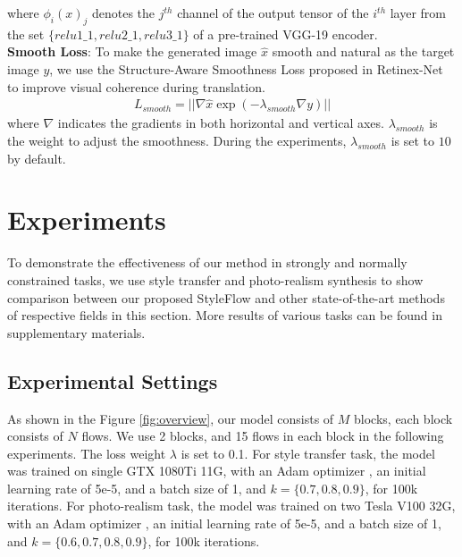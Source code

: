 \documentclass[runningheads]{llncs}
\begin{document}
where $\phi_i(x)_j$ denotes the $j^{th}$ channel of the output tensor of the $i^{th}$ layer from the set  $\{relu1\_1,relu2\_1,relu3\_1\}$ of a pre-trained VGG-19 encoder.\\[1ex]
\noindent\textbf{Smooth Loss}:
To make the generated image $\hat{x}$ smooth and natural as the target image $y$, we use the Structure-Aware Smoothness Loss proposed in Retinex-Net\cite{wei2018deep} to improve visual coherence during translation.
\begin{align}
      L_{smooth} = ||\nabla\hat{x} \exp(-\lambda_{smooth}\nabla y)||
\end{align}
where $\nabla$ indicates the gradients in both horizontal and vertical axes. $\lambda_{smooth}$ is the weight to adjust the smoothness. During the experiments, $\lambda_{smooth}$ is set to $10$ by default.


\section{Experiments}
To demonstrate the effectiveness of our method in strongly and normally constrained tasks, we use style transfer and photo-realism synthesis to show comparison between our proposed StyleFlow and other state-of-the-art methods of respective fields in this section. More results of various tasks can be found in supplementary materials.
\subsection{Experimental Settings}
As shown in the Figure \ref{fig:overview}, our model consists of $M$ blocks, each block consists of $N$ flows. We use 2 blocks, and 15 flows in each block in the following experiments. The loss weight $\lambda$ is set to 0.1. For style transfer task, the model was trained on single GTX 1080Ti 11G, with an Adam optimizer , an initial learning rate of 5e-5, and a batch size of 1, and $k=\{0.7,0.8,0.9\}$, for 100k iterations. For photo-realism task, the model was trained on two Tesla V100 32G, with an Adam optimizer , an initial learning rate of 5e-5, and a batch size of 1, and $k=\{0.6,0.7,0.8,0.9\}$, for 100k iterations.
\end{document}

